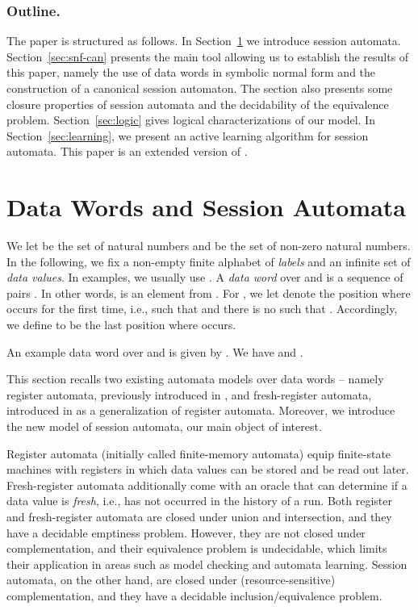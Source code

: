 \documentclass{LMCS}
\begin{document}
\subsubsection*{Outline.}
The paper is structured as follows. In Section~\ref{sec:data} we
introduce session automata. Section~\ref{sec:snf-can} presents the
main tool allowing us to establish the results of this paper, namely
the use of data words in symbolic normal form and the construction of
a canonical session automaton. The section also presents some closure
properties of session automata and the decidability of the equivalence
problem. Section~\ref{sec:logic} gives logical characterizations of
our model.  In Section~\ref{sec:learning}, we present an active
learning algorithm for session automata. This paper is an extended
version of \cite{BHLM-dlt2013}.


\section{Data Words and Session Automata}\label{sec:data}

We let  be the set of natural numbers and  be the set of
non-zero natural numbers. In the following, we fix a non-empty finite
alphabet  of \emph{labels} and an infinite set  of
\emph{data values}.  In examples, we usually use .  A
\emph{data word} over  and  is a sequence  of pairs . In other words,  is an element from . For
, we let  denote the
position  where  occurs for the first time,
i.e., such that  and there is no  such that . Accordingly, we define  to be the last position
where  occurs.

An example data word over  and  is given by
 . We have
 and .

This section recalls two existing automata models over data words --
namely register automata, previously introduced in
\cite{Kaminski1994}, and fresh-register automata, introduced in
\cite{DBLP:conf/popl/Tzevelekos11} as a generalization of register
automata. Moreover, we introduce the new model of session automata,
our main object of interest.

Register automata (initially called finite-memory automata) equip finite-state
machines with registers in which data values can be stored and be read
out later. Fresh-register automata additionally come with an oracle that
can determine if a data value is \emph{fresh}, i.e., has not occurred in the
history of a run. Both register and fresh-register automata
are closed under union and intersection, and they have a decidable emptiness
problem. However, they are not closed under complementation, and their
equivalence problem is undecidable, which limits their application in areas such
as model checking and automata learning.
Session automata, on the other hand, are closed under (resource-sensitive)
complementation, and they have a decidable inclusion/equivalence problem.
\end{document}
